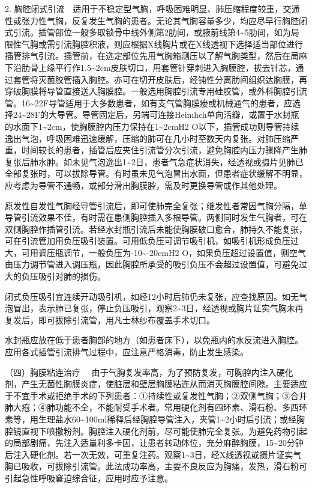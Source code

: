 2.
胸腔闭式引流　适用于不稳定型气胸，呼吸困难明显、肺压缩程度较重，交通性或张力性气胸，反复发生气胸的患者。无论其气胸容量多少，均应尽早行胸腔闭式引流。插管部位一般多取锁骨中线外侧第2肋间，或腋前线第4\textasciitilde{}5肋间，如为局限性气胸或需引流胸腔积液，则应根据X线胸片或在X线透视下选择适当部位进行插管排气引流。插管前，在选定部位先用气胸箱测压以了解气胸类型，然后在局麻下沿肋骨上缘平行作1.5\textasciitilde{}2cm皮肤切口，用套管针穿刺进入胸膜腔，拔去针芯，通过套管将灭菌胶管插入胸腔。亦可在切开皮肤后，经钝性分离肋间组织达胸膜，再穿破胸膜将导管直接送入胸膜腔。一般选用胸腔引流专用硅胶管，或外科胸腔引流管。16\textasciitilde{}22F导管适用于大多数患者，如有支气管胸膜瘘或机械通气的患者，应选择24\textasciitilde{}28F的大导管。导管固定后，另端可连接Heimhch单向活瓣，或置于水封瓶的水面下1\textasciitilde{}2cm，使胸膜腔内压力保持在1\textasciitilde{}2cmH{2}
O以下，插管成功则导管持续逸出气泡，呼吸困难迅速缓解，压缩的肺可在几小时至数天内复张。对肺压缩严重，时间较长的患者，插管后应夹住引流管分次引流，避免胸腔内压力骤降产生肺复张后肺水肿。如未见气泡逸出1\textasciitilde{}2日，患者气急症状消失，经透视或摄片见肺已全部复张时，可以拔除导管。有时虽未见气泡冒出水面，但患者症状缓解不明显，应考虑为导管不通畅，或部分滑出胸膜腔，需及时更换导管或作其他处理。

原发性自发性气胸经导管引流后，即可使肺完全复张；继发性者常因气胸分隔，单导管引流效果不佳，有时需在患侧胸腔插入多根导管。两侧同时发生气胸者，可在双侧胸腔作插管引流。若经水封瓶引流后未能使胸膜破口愈合，肺持久不能复张，可在引流管加用负压吸引装置。可用低负压可调节吸引机，如吸引机形成负压过大，可用调压瓶调节，一般负压为-10\textasciitilde{}-20cmH{2}
O，如果负压超过设置值，则空气由压力调节管进入调压瓶，因此胸腔所承受的吸引负压不会超过设置值，可避免过大的负压吸引对肺的损伤。

闭式负压吸引宜连续开动吸引机，如经12小时后肺仍未复张，应查找原因。如无气泡冒出，表示肺已复张，停止负压吸引，观察2\textasciitilde{}3日，经透视或胸片证实气胸未再复发后，即可拔除引流管，用凡士林纱布覆盖手术切口。

水封瓶应放在低于患者胸部的地方（如患者床下），以免瓶内的水反流进入胸腔。应用各式插管引流排气过程中，应注意严格消毒，防止发生感染。

{（四）胸膜粘连治疗}
　由于气胸复发率高，为了预防复发，可胸腔内注入硬化剂，产生无菌性胸膜炎症，使脏层和壁层胸膜粘连从而消灭胸膜腔间隙。主要适应于不宜手术或拒绝手术的下列患者：①持续性或复发性气胸；②双侧气胸；③合并肺大疱；④肺功能不全，不能耐受手术者。常用硬化剂有四环素、滑石粉、多西环素等，用生理盐水60\textasciitilde{}100ml稀释后经胸腔导管注入，夹管1\textasciitilde{}2小时后引流；或经胸腔镜直视下喷撒粉剂。胸腔注入硬化剂前，尽可能使肺完全复张。为避免药物引起的局部剧痛，先注入适量利多卡因，让患者转动体位，充分麻醉胸膜，15\textasciitilde{}20分钟后注入硬化剂。若一次无效，可重复注药。观察1\textasciitilde{}3日，经X线透视或摄片证实气胸已吸收，可拔除引流管。此法成功率高，主要不良反应为胸痛，发热，滑石粉可引起急性呼吸窘迫综合征，应用时应予注意。

